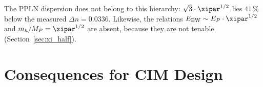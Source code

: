 \begin{table}[H]
    \centering
    \caption{$\xipar^{1/2}$ as the electroweak exponent and further $\xipar$
    powers of T0 theory. The PPLN dispersion does not lie on the
    $\xipar^{1/2}$ rung (Section~\ref{sec:main_result}).}
    \label{tab:universal}
\end{table}

The PPLN dispersion does not belong to this hierarchy: $\sqrt{3}\cdot\xipar^{1/2}$
lies $41\,\%$ below the measured $\Delta n = 0.0336$. Likewise, the relations
$E_\mathrm{EW} \sim E_P\cdot\xipar^{1/2}$ and $m_h/M_P = \xipar^{1/2}$ are absent,
because they are not tenable (Section~\ref{sec:xi_half}).

\clearpage

\section{Consequences for CIM Design}
\label{sec:consequences}

